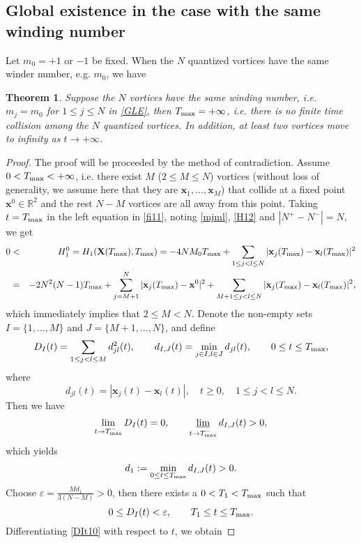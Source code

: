\documentclass{aims}
\theoremstyle{plain}
\newtheorem{theorem}{Theorem}[section]
\theoremstyle{definition}
\newcommand{\bx}{{\mathbf x}}
\newcommand{\bX}{{\mathbf X}}
\newcommand{\nn}{\nonumber}
\newcommand{\be} {\begin{equation}}
\newcommand{\ee}{\end{equation}}
\newcommand{\beas}{\begin{eqnarray*}}
\newcommand{\eeas}{\end{eqnarray*} }
\begin{document}
\subsection{Global existence in the case with the same winding number}
Let $m_0=+1$ or $-1$ be fixed.
When the $N$ quantized vortices have the same winder number, e.g. $m_0$,  we have
\begin{theorem}\label{NNC}
Suppose the $N$ vortices have the same winding number, i.e. $m_j=m_0$ for $1 \le j\le N$ in \eqref{GLE}, then
$T_{\rm max}=+\infty$, i.e. there is no finite time collision among the $N$ quantized vortices. In addition, at least two
vortices move to infinity as $t\rightarrow +\infty$.
\end{theorem}
\begin{proof} The proof will be proceeded by the method of contradiction.
Assume $0<T_{\rm max}<+\infty$, i.e. there exist $M$ ($2\le M\le N$) vortices
(without loss of generality, we assume here that they are $\mathbf
x_1,\ldots,\mathbf x_M$)
that collide at a fixed point $\bx^0\in{\mathbb R}^2$ and the rest
$N-M$ vortices are all away from this point. Taking $t=T_{\rm max}$ in the left equation in \eqref{fi11}, noting \eqref{mjml}, \eqref{H12} and $|N^+-N^-|=N$, we get
\beas
0&<&H_1^0=H_1(\bX(T_{\rm max}),T_{\rm max})=-4NM_0T_{\rm max}
+\sum_{1\leq j<l\leq
N}|\mathbf{x}_j(T_{\rm max})-\mathbf{x}_l(T_{\rm max})|^2 \nn\\
&=&-2N^2(N-1)T_{\rm max}
+\sum_{j=M+1}^N|\mathbf{x}_j(T_{\rm max})-\bx^0|^2+ \sum_{M+1\leq j<l\leq
N}|\mathbf{x}_j(T_{\rm max})-\mathbf{x}_l(T_{\rm max})|^2,
\eeas
which immediately implies that $2\le M<N$.
Denote the non-empty sets $I=\{1,\ldots,M\}$ and $J=\{M+1,\ldots,N\}$, and
define
\be\label{DIt10}
D_I(t)=\sum_{1\leq j<l\leq
M}d_{jl}^2(t), \qquad  d_{I,J}(t)=\min_{j\in I, l\in
J}d_{jl}(t),\qquad 0\le t\le T_{\rm max},
\ee
where
\begin{equation}
d_{jl}(t)=|\bx_j(t)-\bx_l(t)|, %
\quad t\ge0, \quad 1\le j< l\le N.\nonumber
\end{equation}
Then we have
\be
\lim_{t\rightarrow T_{\rm max}^-}D_{I}(t)=0,\qquad  \mathop{\underline
{\lim } }\limits_{t \rightarrow T_{\rm max}^- }d_{I,J}(t)>0,\nonumber
\ee
which yields
\be
d_1:=\min_{0\le t\le T_{\rm max}} d_{I,J}(t)>0.\nonumber
\ee
Choose $\varepsilon= \frac{Md_1}{3(N-M)}>0$, then there exists a
$0<T_1<T_{\rm max}$ such that
\[  0\le D_{I}(t)<\varepsilon, \qquad T_1\le t\le T_{\rm max}.\]
Differentiating \eqref{DIt10} with respect to $t$, we obtain

\end{proof}
\end{document}
